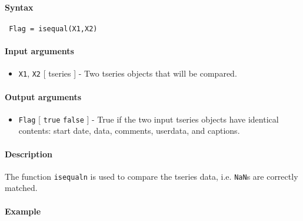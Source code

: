 


	\paragraph{Syntax}
 
 \begin{verbatim}
 Flag = isequal(X1,X2)
 \end{verbatim}
 
 \paragraph{Input arguments}
 
 \begin{itemize}
 \item
   \texttt{X1}, \texttt{X2} {[} tseries {]} - Two tseries objects that
   will be compared.
 \end{itemize}
 
 \paragraph{Output arguments}
 
 \begin{itemize}
 \item
   \texttt{Flag} {[} \texttt{true} \textbar{} \texttt{false} {]} - True
   if the two input tseries objects have identical contents: start date,
   data, comments, userdata, and captions.
 \end{itemize}
 
 \paragraph{Description}
 
 The function \texttt{isequaln} is used to compare the tseries data, i.e.
 \texttt{NaN}s are correctly matched.
 
 \paragraph{Example}


